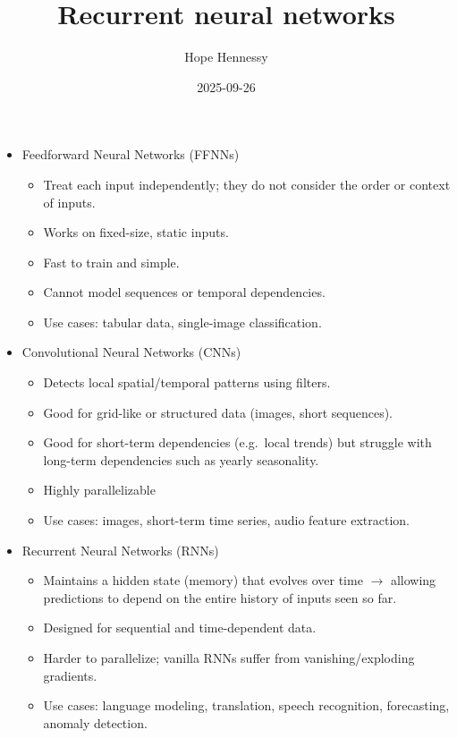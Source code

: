 \documentclass[
]{article}
\title{Recurrent neural networks}
\author{Hope Hennessy}
\date{2025-09-26}
\providecommand{\tightlist}{%
  \setlength{\itemsep}{0pt}\setlength{\parskip}{0pt}}
\begin{document}
\maketitle

\begin{itemize}
\tightlist
\item
  Feedforward Neural Networks (FFNNs)

  \begin{itemize}
  \tightlist
  \item
    Treat each input independently; they do not consider the order or
    context of inputs.
  \item
    Works on fixed-size, static inputs.
  \item
    Fast to train and simple.
  \item
    Cannot model sequences or temporal dependencies.
  \item
    Use cases: tabular data, single-image classification.
  \end{itemize}
\item
  Convolutional Neural Networks (CNNs)

  \begin{itemize}
  \tightlist
  \item
    Detects local spatial/temporal patterns using filters.
  \item
    Good for grid-like or structured data (images, short sequences).
  \item
    Good for short-term dependencies (e.g.~local trends) but struggle
    with long-term dependencies such as yearly seasonality.
  \item
    Highly parallelizable
  \item
    Use cases: images, short-term time series, audio feature extraction.
  \end{itemize}
\item
  Recurrent Neural Networks (RNNs)

  \begin{itemize}
  \tightlist
  \item
    Maintains a hidden state (memory) that evolves over time \(\to\)
    allowing predictions to depend on the entire history of inputs seen
    so far.
  \item
    Designed for sequential and time-dependent data.
  \item
    Harder to parallelize; vanilla RNNs suffer from vanishing/exploding
    gradients.
  \item
    Use cases: language modeling, translation, speech recognition,
    forecasting, anomaly detection.
  \end{itemize}
\end{itemize}
\end{document}

